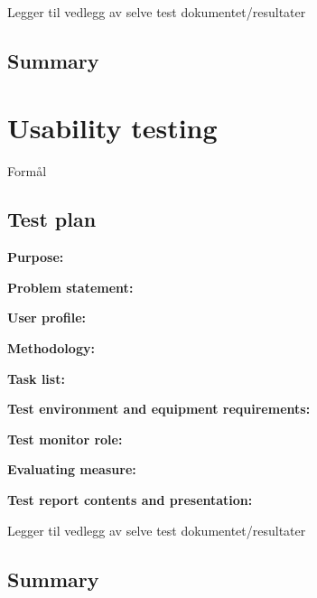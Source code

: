 Legger til vedlegg av selve test dokumentet/resultater

\subsection{Summary}


\section{Usability testing}
Formål

\subsection{Test plan}
\textbf{Purpose:}

\textbf{Problem statement:}

\textbf{User profile:}

\textbf{Methodology:}

\textbf{Task list:}

\textbf{Test environment and equipment requirements:}

\textbf{Test monitor role:}

\textbf{Evaluating measure:}

\textbf{Test report contents and presentation:}

Legger til vedlegg av selve test dokumentet/resultater

\subsection{Summary}

